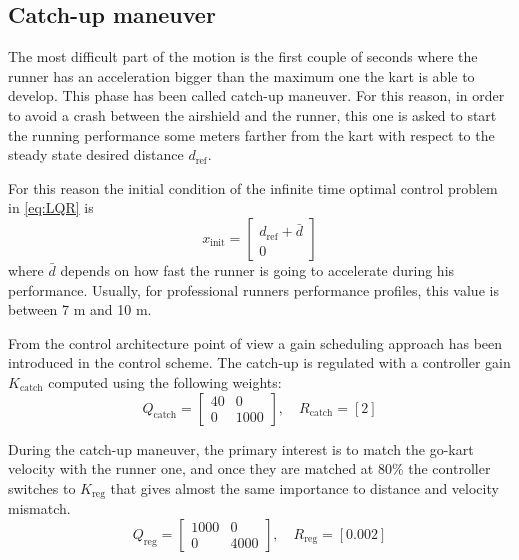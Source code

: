 \documentclass[a4paper,12pt,oneside]{book}
\begin{document}
\subsection{Catch-up maneuver}
The most difficult part of the motion is the first couple of seconds where the runner has an acceleration bigger than the maximum one the kart is able to develop. 
This phase has been called catch-up maneuver.
For this reason, in order to avoid a crash between the airshield and the runner, this one is asked to start the running performance some meters farther from the kart with respect to the steady state desired distance $d_{\text{ref}}$.

For this reason the initial condition of the infinite time optimal control problem in \ref{eq:LQR} is 
\begin{equation}
    x_{\text{init}} =
    \begin{bmatrix}
        d_{\text{ref}} + \bar{d} \\
        0
    \end{bmatrix}
\end{equation}
where $\bar{d}$ depends on how fast the runner is going to accelerate during his performance. Usually, for professional runners performance profiles, this value is between 7 m and 10 m.
 
\bigskip
From the control architecture point of view a gain scheduling approach has been introduced in the control scheme.
The catch-up is regulated with a controller gain $K_{\text{catch}}$ computed using the following weights: 
\begin{equation}
    Q_{\text{catch}} =
    \begin{bmatrix}
        40 & 0 \\
        0 & 1000
    \end{bmatrix},
    \quad
    R_{\text{catch}} = [2]
\end{equation}

During the catch-up maneuver, the primary interest is to match the go-kart velocity with the runner one, and once they are matched at 80\% the controller switches to $K_{\text{reg}}$ that gives almost the same importance to distance and velocity mismatch.
\begin{equation}
    Q_{\text{reg}} =
    \begin{bmatrix}
        1000 & 0 \\
        0 & 4000
    \end{bmatrix},
    \quad
    R_{\text{reg}} = [0.002]
\end{equation}
\end{document}
